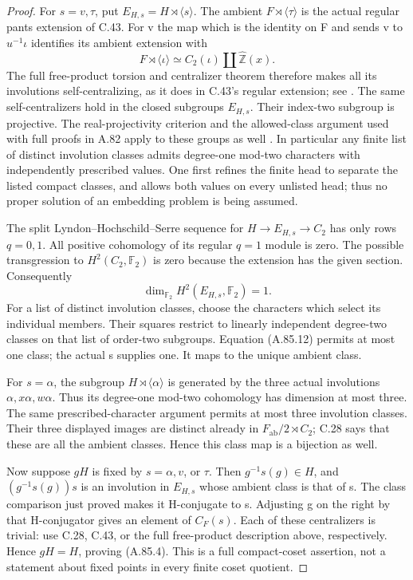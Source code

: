 \begin{proof}
For \(s=v,\tau\), put \(E_{H,s}=H\rtimes\langle s\rangle\).
The ambient \(F\rtimes\langle\tau\rangle\) is the actual
regular pants extension of C.43. For v the map which is the identity
on F and sends v to \(u^{-1}\iota\) identifies its ambient
extension with
\[
       F\rtimes\langle\iota\rangle
          \simeq C_2(\iota)\amalg\widehat{\mathbb Z}(x).
\]
The full free-product torsion and centralizer theorem therefore makes
all its involutions self-centralizing, as it does in C.43's regular
extension; see \citet[Theorems A' and B']{A_HR1985}. The same
self-centralizers hold in the closed subgroups \(E_{H,s}\).
Their index-two subgroup is projective. The real-projectivity
criterion and the allowed-class argument used with full proofs in
A.82 apply to these groups as well
\citep[Theorem~2.1]{A_PalQuickFormal2025}
\citep[Definition~1.1(4), Remark~1.2(b), Proposition~2.3]{AHaran1990}.
In particular any finite list of distinct involution classes admits
degree-one mod-two characters with independently prescribed values.
One first refines the finite head to separate the listed compact
classes, and allows both values on every unlisted head; thus no
proper solution of an embedding problem is being assumed.

The split Lyndon--Hochschild--Serre sequence for
\(H\to E_{H,s}\to C_2\) has only rows \(q=0,1\).
All positive cohomology of its regular \(q=1\) module is zero.
The possible transgression to \(H^2(C_2,\mathbb F_2)\) is zero
because the extension has the given section. Consequently
\[
          \dim_{\mathbb F_2}H^2(E_{H,s},\mathbb F_2)=1.
 \tag{A.85.12}
\]
For a list of distinct involution classes, choose the characters
which select its individual members. Their squares restrict to
linearly independent degree-two classes on that list of order-two
subgroups. Equation (A.85.12) permits at most one class; the actual
s supplies one. It maps to the unique ambient class.

For \(s=\alpha\), the subgroup \(H\rtimes\langle\alpha\rangle\)
is generated by the three actual involutions
\(\alpha,x\alpha,w\alpha\). Thus its degree-one mod-two
cohomology has dimension at most three. The same prescribed-character
argument permits at most three involution classes. Their three
displayed images are distinct already in
\(F_{\mathrm{ab}}/2\rtimes C_2\); C.28 says that these are
all the ambient classes. Hence this class map is a bijection as well.

Now suppose \(gH\) is fixed by \(s=\alpha,v\), or \(\tau\).
Then \(g^{-1}s(g)\in H\), and
\((g^{-1}s(g))s\) is an involution in \(E_{H,s}\) whose
ambient class is that of s. The class comparison just proved makes
it H-conjugate to s. Adjusting g on the right by that H-conjugator
gives an element of \(C_F(s)\). Each of these centralizers is
trivial: use C.28, C.43, or the full free-product description above,
respectively. Hence \(gH=H\), proving (A.85.4). This is a full
compact-coset assertion, not a statement about fixed points in every
finite coset quotient.


\end{proof}
